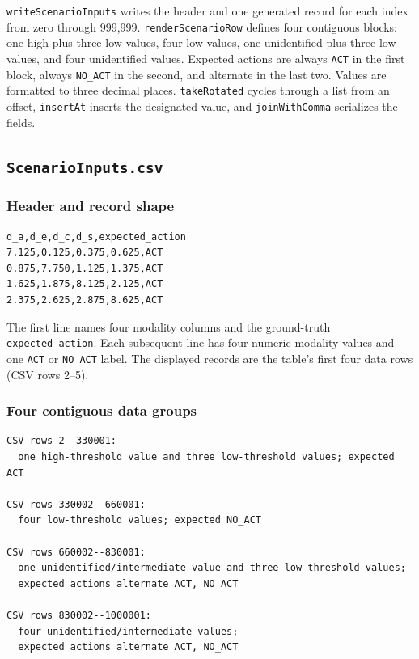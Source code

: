 \documentclass[11pt]{article}
\begin{document}
\texttt{writeScenarioInputs} writes the header and one generated record for
each index from zero through 999,999. \texttt{renderScenarioRow} defines four
contiguous blocks: one high plus three low values, four low values, one
unidentified plus three low values, and four unidentified values. Expected
actions are always \texttt{ACT} in the first block, always \texttt{NO\_ACT}
in the second, and alternate in the last two. Values are formatted to three
decimal places. \texttt{takeRotated} cycles through a list from an offset,
\texttt{insertAt} inserts the designated value, and \texttt{joinWithComma}
serializes the fields.

\subsection{\texttt{ScenarioInputs.csv}}

\subsubsection{Header and record shape}

\begin{lstlisting}[basicstyle=\ttfamily\small]
d_a,d_e,d_c,d_s,expected_action
7.125,0.125,0.375,0.625,ACT
0.875,7.750,1.125,1.375,ACT
1.625,1.875,8.125,2.125,ACT
2.375,2.625,2.875,8.625,ACT
\end{lstlisting}

The first line names four modality columns and the ground-truth
\texttt{expected\_action}. Each subsequent line has four numeric modality
values and one \texttt{ACT} or \texttt{NO\_ACT} label. The displayed records
are the table's first four data rows (CSV rows 2--5).

\subsubsection{Four contiguous data groups}

\begin{lstlisting}[basicstyle=\ttfamily\small]
CSV rows 2--330001:
  one high-threshold value and three low-threshold values; expected ACT

CSV rows 330002--660001:
  four low-threshold values; expected NO_ACT

CSV rows 660002--830001:
  one unidentified/intermediate value and three low-threshold values;
  expected actions alternate ACT, NO_ACT

CSV rows 830002--1000001:
  four unidentified/intermediate values;
  expected actions alternate ACT, NO_ACT
\end{lstlisting}
\end{document}
